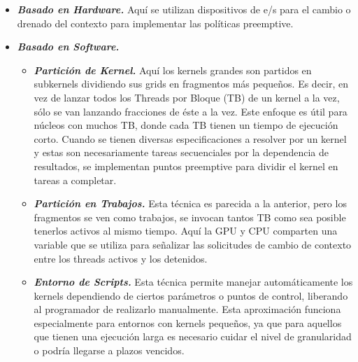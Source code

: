 \begin{itemize}
\item \textbf{\textit{Basado en Hardware.}} 
	Aquí se utilizan dispositivos de e/s para el cambio o drenado del \gls{contexto} para implementar las políticas \gls{preemptive}. 	

\item \textbf{\textit{Basado en Software.}}
	\begin{itemize}
	\item \textbf{\textit{Partición de Kernel.}}
		Aquí los kernels grandes son partidos en subkernels dividiendo sus grids en fragmentos más pequeños. Es decir, en vez de lanzar todos los Threads por Bloque (\gls{TB}) de un kernel a la vez, sólo se van lanzando fracciones de éste a la vez. Este enfoque es útil para núcleos con muchos \gls{TB}, donde cada \gls{TB} tienen un tiempo de ejecución corto. Cuando se tienen diversas especificaciones a resolver por un kernel y estas son necesariamente tareas secuenciales por la dependencia de resultados, se implementan puntos \gls{preemptive} para dividir el kernel en tareas a completar.  
	
	\item \textbf{\textit{Partición en Trabajos.}}
		Esta técnica es parecida a la anterior, pero los fragmentos se ven como trabajos, se invocan tantos \gls{TB} como sea posible tenerlos activos al mismo tiempo. Aquí la \acrshort{GPU} y \acrshort{CPU} comparten una variable que se utiliza para señalizar las solicitudes de cambio de \gls{contexto} entre los threads activos y los detenidos.

	\item \textbf{\textit{Entorno de Scripts.}}	
		Esta técnica permite manejar automáticamente los kernels dependiendo de ciertos parámetros o puntos de control, liberando al programador de realizarlo manualmente. Esta aproximación funciona especialmente para entornos con kernels pequeños, ya que para aquellos que tienen una ejecución larga es necesario cuidar el nivel de granularidad o podría llegarse a plazos vencidos.
		

\end{itemize}
\end{itemize}
